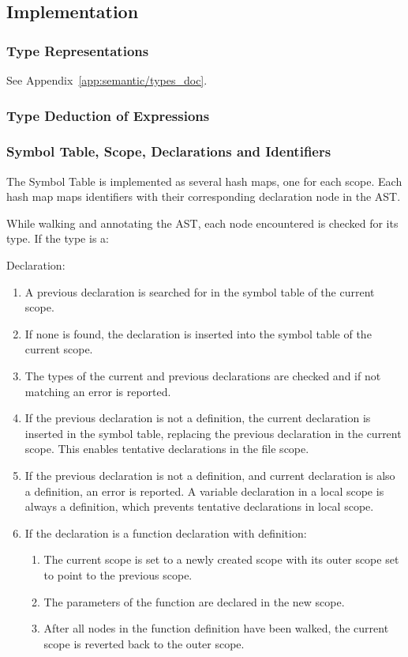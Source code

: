 \subsection{Implementation}

\subsubsection{Type Representations}

See Appendix~\ref{app:semantic/types_doc}.

\subsubsection{Type Deduction of Expressions}



\subsubsection{Symbol Table, Scope, Declarations and Identifiers}

The Symbol Table is implemented as several hash maps, one for each scope. Each hash map maps identifiers with their corresponding declaration node in the AST.

While walking and annotating the AST, each node encountered is checked for its type. If the type is a:

Declaration:
\begin{enumerate}
	\item A previous declaration is searched for in the symbol table of the current scope.
	\item If none is found, the declaration is inserted into the symbol table of the current scope.
	\item The types of the current and previous declarations are checked and if not matching an error is reported.
	\item If the previous declaration is not a definition, the current declaration is inserted in the symbol table, replacing the previous declaration in the current scope. This enables tentative declarations in the file scope.
	\item If the previous declaration is not a definition, and current declaration is also a definition, an error is reported. A variable declaration in a local scope is always a definition, which prevents tentative declarations in local scope.
	\item If the declaration is a function declaration with definition:
	\begin{enumerate}[1.]
		\item The current scope is set to a newly created scope with its outer scope set to point to the previous scope.
		\item The parameters of the function are declared in the new scope.
		\item After all nodes in the function definition have been walked, the current scope is reverted back to the outer scope.
	\end{enumerate}
\end{enumerate}

